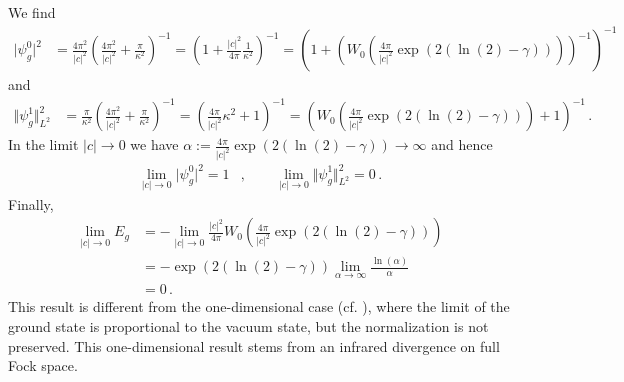 We find
\begin{align*}
  \vert \psi_{g}^{0} \vert^{2}
  &=
  \frac{4\pi^{2}}{\vert c \vert^{2}}
  \left(
    \frac{4\pi^{2}}{\vert c \vert^{2}}
    +
    \frac{\pi}{\kappa^{2}}
  \right)^{-1}
  =
  \left(
    1
    +
    \frac{\vert c \vert^{2}}{4\pi}
    \frac{1}{\kappa^{2}}
  \right)^{-1}
  =
  \left(
    1
    +
    \left(
      W_{0}
      \left(
        \frac{4\pi}{\vert c \vert^{2}}
        \exp(2(\ln(2) - \gamma))
      \right)
    \right)^{-1}
  \right)^{-1}
\end{align*}
and
\begin{align*}
  \Vert \psi_{g}^{1} \Vert_{L^{2}}^{2}
  &=
  \frac{\pi}{\kappa^{2}}
  \left(
    \frac{4\pi^{2}}{\vert c \vert^{2}}
    +
    \frac{\pi}{\kappa^{2}}
  \right)^{-1}
  =
  \left(
    \frac{4\pi}{\vert c \vert^{2}}
    \kappa^{2}
    +
    1
  \right)^{-1}
  =
  \left(
    W_{0}
    \left(
      \frac{4\pi}{\vert c \vert^{2}}
      \exp(2(\ln(2) - \gamma))
    \right)
    +
    1
  \right)^{-1}
  \,.
\end{align*}
In the limit $\vert c \vert \to 0$ we have $\alpha := \frac{4\pi}{\vert c \vert^{2}}\exp(2(\ln(2) - \gamma)) \to \infty$ and hence
\begin{align*}
  \lim_{\vert c \vert \to 0}
  \vert \psi_{g}^{0} \vert^{2}
  =
  1
  &,\qquad
  \lim_{\vert c \vert \to 0}
  \Vert \psi_{g}^{1} \Vert_{L^{2}}^{2}
  =
  0
  \,.
\end{align*}
Finally,
\begin{align*}
  \lim_{\vert c \vert \to 0}
  E_{g}
  &=
  -
  \lim_{\vert c \vert \to 0}
  \frac{\vert c \vert^{2}}{4\pi}
  W_{0}
  \left(
    \frac{4\pi}{\vert c \vert^{2}}
    \exp(2(\ln(2) - \gamma))
  \right)
  \\
  &=
  -
  \exp(2(\ln(2) - \gamma))
  \lim_{\alpha \to \infty}
  \frac{\ln(\alpha)}{\alpha}
  \\
  &=
  0
  \,.
\end{align*}
This result is different from the one-dimensional case (cf. \cite{3d622ca2}), where the limit of the ground state is proportional to the vacuum state, but the normalization is not preserved. This one-dimensional result stems from an infrared divergence on full Fock space.
